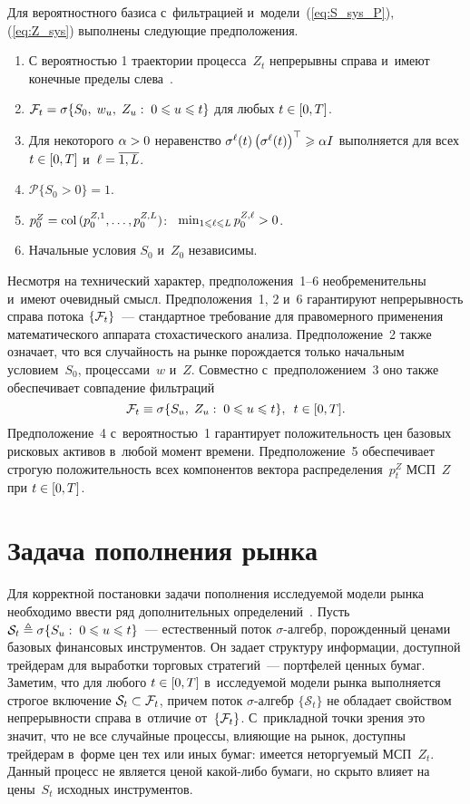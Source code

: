 \begin{multicols}{2}
Для вероятностного базиса с~фильтрацией и~модели~(\ref{eq:S_sys_P}), (\ref{eq:Z_sys}) выполнены следующие предположения.
\begin{enumerate}[1.]
\item
С вероятностью 1 траектории процесса~$Z_t$ непрерывны справа и~имеют конечные пределы слева~\cite{liptser2012theory}.
\item
$\ff_t = \sigma \{S_0,\;w_u,\;Z_u: \;0 \leqslant u \hm\leqslant t\}$ для любых $t \hm\in [0,T]$.
\item
Для некоторого $\alpha \hm> 0$ неравенство
$\sigma^{\ell}(t)\left( \sigma^{\ell}(t)\right)^{\top} \hm\geqslant \alpha I$ выполняется для всех $t\hm \in [0,T]$ и~$\ell\hm = \overline{1,L}$.
\item
$\mathcal{P}\{S_0 > 0\} =1$.
\item
$p_0^Z = \mathop{\mathrm{col}}\, (p_0^{Z,1},\ldots,p_0^{Z,L})$: $\enskip \min_{1 \leqslant \ell \leqslant L}p_0^{Z,\ell} \hm>0$.
\item
Начальные условия $S_0$ и~$Z_0$ независимы.
\end{enumerate}

Несмотря на технический характер, предположения~1--6 необременительны и~имеют очевидный смысл. Предположения~1, 2 и~6 
гарантируют непрерывность справа потока $\{{\mathcal F}_t\}$~--- стандартное требование для правомерного применения математического аппарата
 стохастического анализа. Предположение~2 также означает, что вся случайность на рынке порождается
только начальным условием~$S_0$, процессами~$w$ и~$Z$. Совместно с~предположением~3 оно также обеспечивает совпадение фильтраций
$$
{\mathcal F}_t \equiv \sigma\{ S_u, \; Z_u: \; 0 \leqslant u \leqslant t\}, \enskip t \in [0,T].
$$
Предположение~4 с~вероятностью~1 гарантирует положительность цен базовых рисковых активов в~любой момент времени. 
Предположение~5 обеспечивает строгую положительность всех компонентов вектора распределения~$p_t^Z$ МСП~$Z$ при $t \hm\in [0,T]$.

\section{Задача пополнения рынка}

Для корректной постановки задачи пополнения исследуемой модели рынка необходимо ввес\-ти ряд дополнительных определений~\cite{shiryaev1999essentials}. 
Пусть $\mathcal{S}_t \triangleq \sigma \{ S_u: \; 0 \hm\leqslant u \hm\leqslant t \}$~--- естественный поток $\sigma$-ал\-гебр, порожденный 
ценами базовых финансовых инструментов. Он задает структуру информации, доступной трейдерам для выработки торговых стратегий~--- портфелей ценных бумаг.
Заметим, что для любого $t \hm\in [0,T]$ в~исследуемой модели рынка выполняется строгое включение $\mathcal{S}_t \hm\subset \ff_t$, причем поток $\sigma$-ал\-гебр
$\{\mathcal{S}_t\}$ не обладает свойством непрерывности справа в~отличие от~$\{{\mathcal F}_t\}$. С~прикладной точки зрения это значит, 
что не все случайные процессы, влияющие на рынок, доступны трейдерам в~форме цен тех или иных бумаг: имеется неторгуемый МСП~$Z_t$. 
Данный процесс не является ценой ка\-кой-ли\-бо бумаги, но скрыто влияет на цены~$S_t$ исходных инструментов.


\end{multicols}
